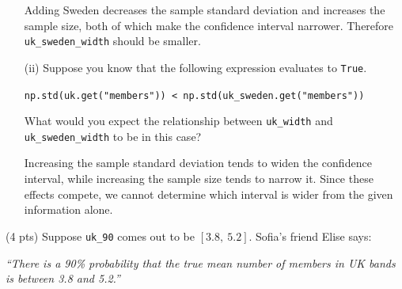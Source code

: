 \documentclass[twoside,12pt]{article}
\begin{document}
\begin{probset}
\begin{prob}[(16 pts)]
\begin{subprobset}
\begin{subprob}
\begin{enumerate}
\smallskip
{}

\smallskip
{}

\begin{soln}
Adding Sweden decreases the sample standard deviation and increases the sample size, both of which make the confidence interval narrower. Therefore \texttt{uk\_sweden\_width} should be smaller.
\end{soln}

\medskip


    \item [(ii)]  Suppose you know that the following expression evaluates to \texttt{True}.

    \medskip
    
    \verb|np.std(uk.get("members")) < np.std(uk_sweden.get("members"))|

    \medskip
    
    What would you expect the relationship between \texttt{uk\_width} and \texttt{uk\_sweden\_width} to be in this case?

\medskip
{}

\smallskip
{}

\smallskip
{}

\smallskip
{}

\begin{soln}
Increasing the sample standard deviation tends to widen the confidence interval, while increasing the sample size tends to narrow it. Since these effects compete, we cannot determine which interval is wider from the given information alone.
\end{soln}

\end{enumerate}

\end{subprob}

\bigskip

\begin{subprob}(4 pts)
Suppose \texttt{uk\_90} comes out to be $[3.8,\ 5.2]$. Sofia's friend Elise says:

\smallskip

\textit{``There is a 90\% probability that the true mean number of members in UK bands is between 3.8 and 5.2.''}


\end{subprob}
\end{subprobset}
\end{prob}
\end{probset}
\end{document}
